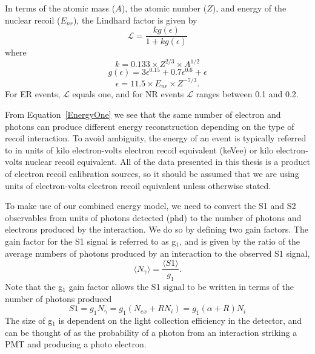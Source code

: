 In terms of the atomic mass ($A$), the atomic number ($Z$), and energy of the nuclear recoil ($E_{nr}$), the Lindhard factor is given by 
\begin{equation}
\mathcal{L}=\frac{kg(\epsilon)}{1 + kg(\epsilon)}
\end{equation}
where
\begin{equation}
k=0.133 \times Z^{2/3} \times A^{1/2}
\end{equation}
\begin{equation}
g(\epsilon)=3\epsilon^{0.15} + 0.7\epsilon^{0.6} +\epsilon
\end{equation}
\begin{equation}
\epsilon = 11.5 \times E_{nr} \times Z^{-7/3}.
\end{equation}  For ER events, $\mathcal{L}$ equals one, and for NR events $\mathcal{L}$ ranges between 0.1 and 0.2.

From Equation~\ref{EnergyOne} we see that the same number of electron and photons can produce different energy reconstruction depending on the type of recoil interaction.  To avoid ambiguity, the energy of an event is typically referred to in units of kilo electron-volts electron recoil equivalent (keVee) or kilo electron-volts nuclear recoil equivalent.  All of the data presented in this thesis is a product of electron recoil calibration sources, so it should be assumed that we are using units of electron-volts electron recoil equivalent unless otherwise stated.

To make use of our combined energy model, we need to convert the S1 and S2 observables from units of photons detected (phd) to the number of photons and electrons produced by the interaction.  We do so by defining two gain factors.  The gain factor for the S1 signal is referred to as g$_1$, and is given by the ratio of the average numbers of photons produced by an interaction to the observed S1 signal,
\begin{equation}
\langle N_\gamma \rangle = \frac{ \langle S1 \rangle }{g_1}.
\end{equation}
Note that the g$_1$ gain factor allows the S1 signal to be written in terms of the number of photons produced
\begin{equation}
S1=g_1 N_\gamma = g_1 (N_{ex} + R N_i) = g_1  (\alpha + R) N_i
\end{equation}
The size of g$_1$ is dependent on the light collection efficiency in the detector, and can be thought of as the probability of a photon from an interaction striking a PMT and producing a photo electron. 

